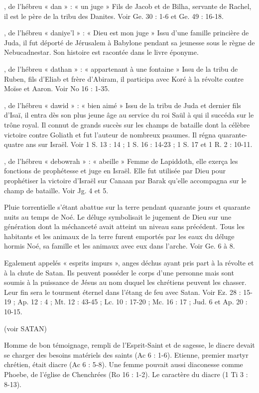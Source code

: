 \begin{multicols}{2}
, de l'hébreu « dan » : « un juge »
Fils de Jacob et de Bilha, servante de Rachel, il est le père de la tribu des Danites. Voir Ge. 30 : 1-6 et Ge. 49 : 16-18.

, de l'hébreu « daniye'l » : « Dieu est mon juge »
Issu d’une famille princière de Juda, il fut déporté de Jérusalem à Babylone pendant sa jeunesse sous le règne de Nebucadnestar. Son histoire est racontée dans le livre éponyme.

, de l'hébreu « dathan » : « appartenant à une fontaine »
Issu de la tribu de Ruben, fils d’Eliab et frère d’Abiram, il participa avec Koré à la révolte contre Moïse et Aaron. Voir No 16 : 1-35.

, de l'hébreu « dawid » : « bien aimé »
Issu de la tribu de Juda et dernier fils d'Isaï, il entra dès son plus jeune âge au service du roi Saül à qui il succéda sur le trône royal. Il connut de grands succès sur les champs de bataille dont la célèbre victoire contre Goliath et fut l’auteur de nombreux psaumes. Il régna quarante-quatre ans sur Israël. Voir 1 S. 13 : 14 ; 1 S. 16 : 14-23 ; 1 S. 17 et 1 R. 2 : 10-11.

, de l'hébreu « debowrah » : « abeille »
Femme de Lapiddoth, elle exerça les fonctions de prophétesse et juge en Israël. Elle fut utilisée par Dieu pour prophétiser la victoire d’Israël sur Canaan par Barak qu’elle accompagna sur le champ de bataille. Voir Jg. 4 et 5.

Pluie torrentielle s’étant abattue sur la terre pendant quarante jours et quarante nuits au temps de Noé. Le déluge symbolisait le jugement de Dieu sur une génération dont la méchanceté avait atteint un niveau sans précédent. Tous les habitants et les animaux de la terre furent emportés par les eaux du déluge hormis Noé, sa famille et les animaux avec eux dans l’arche. Voir Ge. 6 à 8.

Egalement appelés « esprits impurs », anges déchus ayant pris part à la révolte et à la chute de Satan. Ils peuvent posséder le corps d'une personne mais sont soumis à la puissance de Jésus au nom duquel les chrétiens peuvent les chasser. Leur fin sera le tourment éternel dans l’étang de feu avec Satan. Voir Ez. 28 : 15-19 ; Ap. 12 : 4 ; Mt. 12 : 43-45 ; Lc. 10 : 17-20 ; Mc. 16 : 17 ; Jud. 6 et Ap. 20 : 10-15.

(voir SATAN)

Homme de bon témoignage, rempli de l'Esprit-Saint et de sagesse, le diacre devait se charger des besoins matériels des saints (Ac 6 : 1-6). Etienne, premier martyr chrétien, était diacre (Ac 6 : 5-8). Une femme pouvait aussi diaconesse comme Phoebe, de l'église de Chenchrées (Ro 16 : 1-2). Le caractère du diacre (1 Ti 3 : 8-13).


\end{multicols}
